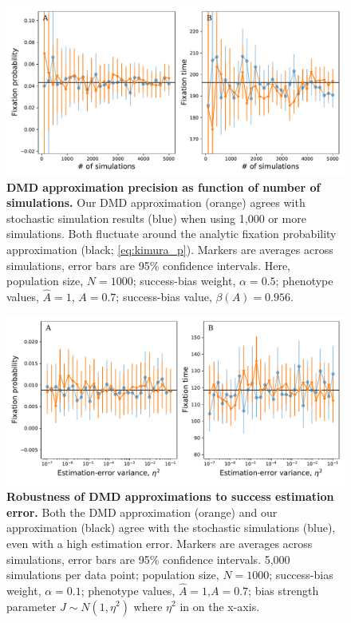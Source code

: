 \documentclass[12pt]{extarticle}
\begin{document}
\begin{figure}[h]
    \includegraphics[width=\linewidth]{num_sims.pdf}
  \caption{
  \textbf{DMD approximation precision as function of number of simulations.}
  Our DMD approximation (orange) agrees with stochastic simulation results (blue) when using 1,000 or more simulations.
  Both fluctuate around the analytic fixation probability approximation (black; \cref{eq:kimura_p}).
  Markers are averages across simulations, error bars are 95\% confidence intervals.
  Here, population size, $N=1000$; success-bias weight, $\alpha=0.5$; phenotype values, $\hat{A}=1$, $A=0.7$; success-bias value, $\beta(A)=0.956$.}	
  \label{fig:num_sims}
\end{figure}


\begin{figure}
    \includegraphics[width=\linewidth]{full_vs_dm_mutation.pdf}
  \caption{
  \textbf{Robustness of DMD approximations to success estimation error.}
  Both the DMD approximation (orange) and our approximation (black) agree with the stochastic simulations (blue), even with a high estimation error.
  Markers are averages across simulations, error bars are 95\% confidence intervals.
  5,000 simulations per data point; population size, $N=1000$; success-bias weight, $\alpha=0.1$; phenotype values, $\hat{A}=1$,$A=0.7$; bias strength parameter $J\sim N(1,\eta^2)$ where $\eta^2$ in on the x-axis.
  }	
  \label{fig:hetro_error}
\end{figure}
\end{document}
